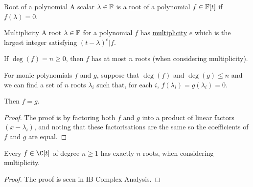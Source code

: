 \documentclass[../Main.tex]{subfiles}
\begin{document}
\begin{definition}{Root of a polynomial}
    A scalar $\lambda \in \mathbb{F}$ is a \underline{root} of a polynomial $f \in \mathbb{F}[t]$ if $f(\lambda) = 0$.
\end{definition}
\begin{definition}{Multiplicity}
    A root $\lambda \in \mathbb{F}$ for a polynomial $f$ has \underline{multiplicity} $e$ which is the largest integer satisfying $(t - \lambda)^e | f$.
\end{definition}
\begin{corollary}
    If $\deg(f) = n \geq 0$, then $f$ has at most $n$ roots (when considering multiplicity).
    \label{corPolyNRoots}
\end{corollary}
\begin{corollary}
    For monic polynomials $f$ and $g$, suppose that $\deg(f)$ and $\deg(g) \leq n$ and we can find a set of $n$ roots $\lambda_i$ such that, for each $i$, $f(\lambda_i) = g(\lambda_i) = 0$.

    Then $f = g$.
    \label{corPolyCompareRoots}
\end{corollary}
\begin{proof}
    The proof is by factoring both $f$ and $g$ into a product of linear factors $(x - \lambda_i)$, and noting that these factorisations are the same so the coefficients of $f$ and $g$ are equal.
\end{proof}
\begin{theorem}
    Every $f \in \C[t]$ of degree $n \geq 1$ has exactly $n$ roots, when considering multiplicity.
    \label{thmFundamentalAlgebra}
\end{theorem}
\begin{proof}
    The proof is seen in IB Complex Analysis.
\end{proof}
\end{document}
